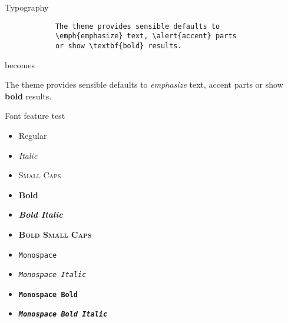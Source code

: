 \documentclass[aspectratio=169]{beamer}
\begin{document}
	\begin{frame}[fragile]{Typography}
		\begin{verbatim}
			The theme provides sensible defaults to
			\emph{emphasize} text, \alert{accent} parts
			or show \textbf{bold} results.
		\end{verbatim}
		
		\begin{center}becomes\end{center}
		
		The theme provides sensible defaults to \emph{emphasize} text,
		\alert{accent} parts or show \textbf{bold} results.
	\end{frame}
		
	\begin{frame}{Font feature test}
		\begin{itemize}
			\item Regular
			\item \textit{Italic}
			\item \textsc{Small Caps}
			\item \textbf{Bold}
			\item \textbf{\textit{Bold Italic}}
			\item \textbf{\textsc{Bold Small Caps}}
			\item \texttt{Monospace}
			\item \texttt{\textit{Monospace Italic}}
			\item \texttt{\textbf{Monospace Bold}}
			\item \texttt{\textbf{\textit{Monospace Bold Italic}}}
		\end{itemize}
	\end{frame}
		
\end{document}
